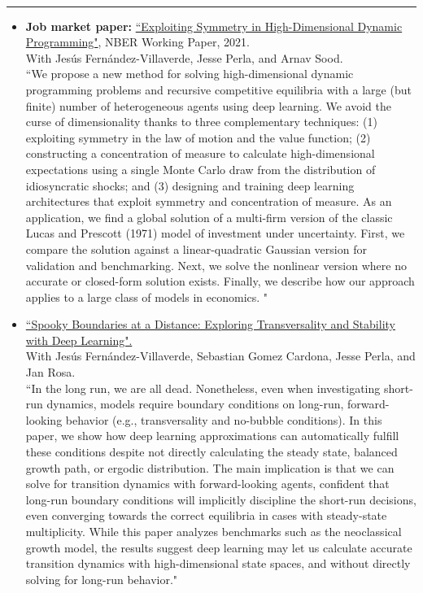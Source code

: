 \documentclass[10pt]{article}
\newcommand{\makeheading}[2][]%
        {\hspace*{-\marginparsep minus \marginparwidth}%
         \begin{minipage}[t]{\textwidth+\marginparwidth+\marginparsep}%
             {\large \bfseries #2 \hfill #1}\\[-0.15\baselineskip]%
                 \rule{\columnwidth}{1pt}%
         \end{minipage}}
\renewcommand{\section}[1]{\pagebreak[3]%
    \hyphenpenalty=10000%
    \vspace{1.3\baselineskip}%
    \phantomsection\addcontentsline{toc}{section}{#1}%
    \noindent\llap{\scshape\smash{\parbox[t]{\marginparwidth}{\raggedright #1}}}%
    \vspace{-\baselineskip}\par}
\newenvironment{innerlist}[1][\enskip\textbullet]%
        {\begin{itemize}[#1,leftmargin=*,parsep=0pt,itemsep=0pt,topsep=0pt,partopsep=0pt]}
        {\end{itemize}}
\begin{document}
\section{Working Papers}\vspace{0 mm}
\makeheading{}\vspace{2 mm}
\begin{innerlist}

\item {\bf Job market paper:} \href{https://www.nber.org/papers/w28981}{``Exploiting Symmetry in High-Dimensional Dynamic Programming"}, NBER Working Paper, 2021.   \\
With Jesús Fernández-Villaverde, Jesse Perla, and Arnav Sood.	\\
``We propose a new method for solving high-dimensional dynamic programming problems and recursive competitive equilibria with a large (but finite) number of heterogeneous agents using deep learning. We avoid the curse of dimensionality thanks to three complementary techniques: (1) exploiting symmetry in the  law of motion and the value function; (2) constructing a concentration of measure to calculate high-dimensional expectations using a single Monte Carlo draw from the distribution of idiosyncratic shocks; and (3) designing and training deep learning architectures that exploit symmetry and concentration of measure. As an application, we find a global solution of a multi-firm version of the classic Lucas and Prescott (1971) model of investment under uncertainty. First, we compare the solution against a linear-quadratic Gaussian version for validation and benchmarking. Next, we solve the nonlinear version where no accurate or closed-form solution exists. Finally, we describe how our approach applies to a large class of models in economics. "\\

	
\item \href{https://mekahou.github.io/docs/Papers/SpookyBoundary.pdf}{``Spooky Boundaries at a Distance: Exploring Transversality and Stability with Deep Learning".} \\
With Jesús Fernández-Villaverde, Sebastian Gomez Cardona, Jesse Perla, and Jan Rosa.\\
``In the long run, we are all dead. Nonetheless, even when investigating short-run dynamics, models require boundary conditions on long-run, forward-looking behavior (e.g., transversality and no-bubble conditions). In this paper, we show how deep learning approximations can automatically fulfill these conditions despite not directly calculating the steady state, balanced growth path, or ergodic distribution. The main implication is that we can solve for transition dynamics with forward-looking agents, confident that long-run boundary conditions will implicitly discipline the short-run decisions, even converging towards the correct equilibria in cases with steady-state multiplicity. While this paper analyzes benchmarks such as the neoclassical growth model, the results suggest deep learning may let us calculate accurate transition dynamics with high-dimensional state spaces, and without directly solving for long-run behavior."\\


\end{innerlist}
\end{document}
